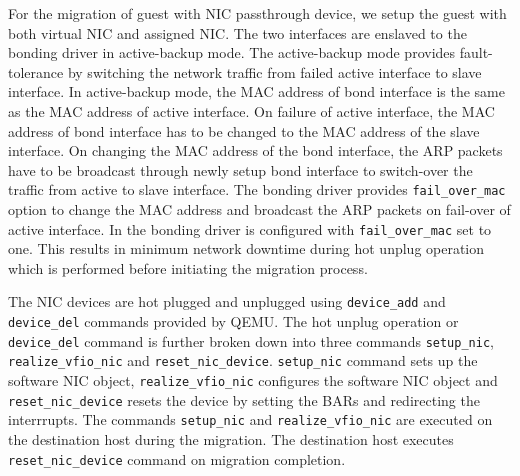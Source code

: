 
For the migration of guest with NIC passthrough device, we setup the 
guest with both virtual NIC and assigned NIC. The two interfaces 
are enslaved to the bonding driver in active-backup mode. The 
active-backup mode provides fault-tolerance by switching the
network traffic from failed active interface to slave interface.
In active-backup mode, the MAC address of bond interface 
is the same as the MAC address of active interface. On failure 
of active interface, the MAC address of bond interface has to 
be changed to the MAC address of the slave interface. On changing
the MAC address of the bond interface, the ARP packets have to be
broadcast through newly setup bond interface to switch-over the
traffic from active to slave interface. The bonding driver 
provides \texttt{fail\_over\_mac} option to change 
the MAC address and broadcast the ARP packets on fail-over of
active interface. In \na the bonding driver is configured 
with \texttt{fail\_over\_mac} set to one. This results in minimum
network downtime during hot unplug operation which is performed
before initiating the migration process.

The NIC devices are hot plugged and unplugged using 
\texttt{device\_add} and \texttt{device\_del} commands provided
by QEMU. The hot unplug operation or \texttt{device\_del} command
is further broken down into three commands \texttt{setup\_nic}, 
\texttt{realize\_vfio\_nic} and \texttt{reset\_nic\_device}.
\texttt{setup\_nic} command sets up the software NIC object, 
\texttt{realize\_vfio\_nic} configures the software NIC object
and \texttt{reset\_nic\_device} resets the device by setting the 
BARs and redirecting the interrrupts. The commands \texttt{setup\_nic}
and \texttt{realize\_vfio\_nic} are executed on the destination host
during the migration. The destination host executes 
\texttt{reset\_nic\_device} command on migration completion.    
